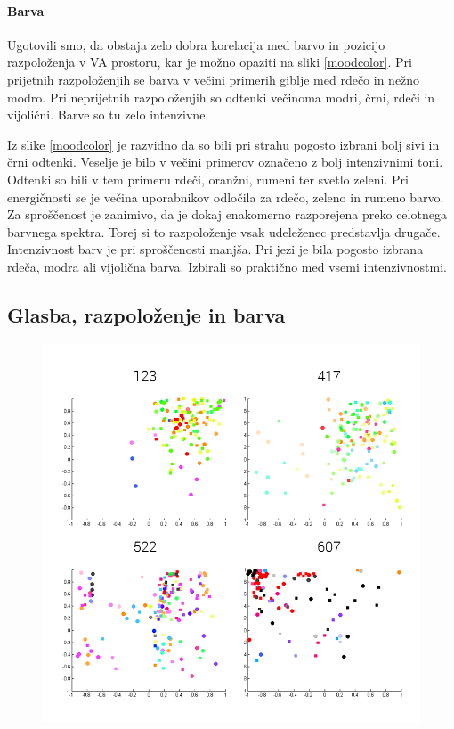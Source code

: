 \documentclass[a4paper, 12pt]{book}
\begin{document}
{\paragraph{Barva}

Ugotovili smo, da obstaja zelo dobra korelacija med barvo in  pozicijo razpoloženja v VA prostoru, kar je možno opaziti na sliki \ref{moodcolor}. Pri prijetnih razpoloženjih se barva v večini primerih giblje med rdečo in nežno modro. Pri neprijetnih razpoloženjih so odtenki večinoma modri, črni, rdeči in vijolični. Barve so tu zelo intenzivne.

Iz slike \ref{moodcolor} je razvidno da so bili pri strahu pogosto izbrani bolj sivi in črni odtenki. Veselje je bilo v večini primerov označeno z bolj intenzivnimi toni. Odtenki so bili v tem primeru rdeči, oranžni, rumeni ter svetlo zeleni. Pri energičnosti se je večina uporabnikov odločila za rdečo, zeleno in rumeno barvo. Za sproščenost je zanimivo, da je dokaj enakomerno razporejena preko celotnega barvnega spektra. Torej si to razpoloženje vsak udeleženec predstavlja drugače. Intenzivnost barv je pri sproščenosti manjša. Pri jezi je bila pogosto izbrana rdeča, modra ali vijolična barva. Izbirali so praktično med vsemi intenzivnostmi.


\subsection{Glasba, razpoloženje in barva}

\begin{figure}[hbt]
\centering
\includegraphics[width=12.5cm]{images/moodmusic.png}


\end{figure}}
\end{document}
